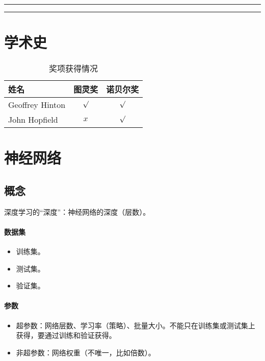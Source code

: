 \documentclass[
12pt, %
a4paper, 
oneside, %
headinclude,footinclude, %
]{scrartcl}
\title{\normalfont\spacedallcaps{深度学习}}
\date{}
\begin{document}
\maketitle
\newpage
\hypertarget{toc}{}
\begingroup
\begin{multicols}{2}
\tableofcontents
\end{multicols}
\endgroup
\hrule
\begingroup
\begin{multicols}{2}
\listoffigures
\end{multicols}
\endgroup
\hrule
\begingroup
\begin{multicols}{2}
\listoftables
\end{multicols}
\endgroup
\newpage
\section{学术史}
\begin{table}[H]
\centering
\begin{tabular}{|l|c|c|}
\hline
姓名 & 图灵奖 & 诺贝尔奖 \\
\hline
Geoffrey Hinton & $ \surd $ & $ \surd $ \\
\hline
John Hopfield & $ x $ & $ \surd $ \\
\hline
\end{tabular}
\caption{奖项获得情况}
\end{table}
\section{神经网络}
\subsection[概念]{概念}
深度学习的“深度”：神经网络的深度（层数）。
\paragraph{数据集}
\begin{itemize}
\item 训练集。
\item 测试集。
\item 验证集。
\end{itemize}
\paragraph{参数}
\begin{itemize}
\item 超参数：网络层数、学习率（策略）、批量大小。不能只在训练集或测试集上获得，要通过训练和验证获得。
\item 非超参数：网络权重（不唯一，比如倍数）。
\end{itemize}
\end{document}
